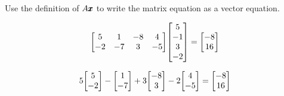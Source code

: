 \documentclass{../mathhomework}
\newenvironment{Mat}{\begin{bmatrix}}{\end{bmatrix}}
\begin{document}
\begin{problem}[1.4\#5]
    Use the definition of $A\pmb{x}$ to write the matrix equation as a vector equation.

    \begin{equation*}
        \begin{Mat}
            5 & 1 & -8 & 4 \\
            -2 & -7 & 3 & -5
        \end{Mat} \begin{Mat}
            5 \\ -1 \\ 3 \\ -2
        \end{Mat} = \begin{Mat}
            -8 \\ 16
        \end{Mat}
    \end{equation*}

    \begin{solution}
        \begin{equation*}
            5\begin{Mat}5\\-2\end{Mat} - \begin{Mat}1\\-7\end{Mat} + 3\begin{Mat}-8\\3\end{Mat} - 2\begin{Mat}4\\-5\end{Mat} = \begin{Mat}-8\\16\end{Mat}
        \end{equation*}
    \end{solution}
\end{problem}
\end{document}
